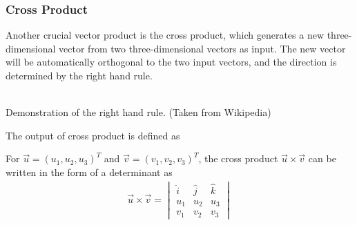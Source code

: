 \subsubsection{Cross Product}
Another crucial vector product is the cross product, which generates a new three-dimensional vector from two three-dimensional vectors as input. The new vector will be automatically orthogonal to the two input vectors, and the direction is determined by the right hand rule.
\begin{center}
\\
Demonstration of the right hand rule. (Taken from Wikipedia)
\end{center}
The output of cross product is defined as
\begin{defn}
\label{crossdet}
For $\vec{u} = (u_1, u_2, u_3)^T$ and $\vec{v} = (v_1, v_2, v_3)^T$, the cross product $\vec{u} \times \vec{v}$ can be written in the form of a determinant as
\begin{align*}
\vec{u} \times \vec{v} =
\begin{vmatrix}
\hat{i} & \hat{j} & \hat{k} \\
u_1 & u_2 & u_3 \\
v_1 & v_2 & v_3
\end{vmatrix}
\end{align*}
\end{defn}

